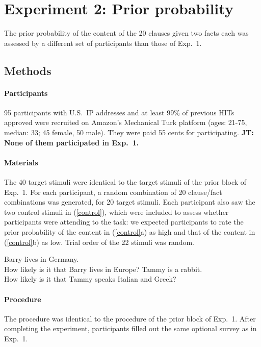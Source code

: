 \documentclass[11pt,fleqn]{article}
\newcommand{\6}{\mbox{$[\hspace*{-.6mm}[$}}
\newcommand{\9}{\mbox{$]\hspace*{-.6mm}]$}}
\newcommand{\jt}[1]{\textbf{\color{blue}JT: #1}}
\begin{document}
\section{Experiment 2: Prior probability}

The prior probability of the content of the 20 clauses given two facts each was assessed by a different set of participants than those of Exp.~1.

\subsection{Methods}

\paragraph{Participants} 95 participants with U.S.\ IP addresses and at least 99\% of previous HITs approved were recruited on Amazon's Mechanical Turk platform (ages: 21-75, median: 33; 45 female, 50 male). They were paid 55 cents for participating. \jt{None of them participated in Exp.~1.}

\paragraph{Materials} The 40 target stimuli were identical to the target stimuli of the prior block of Exp.~1. For each participant, a random combination of 20 clause/fact combinations was generated, for 20 target stimuli. Each participant also saw the two control stimuli in (\ref{control}), which were included to assess whether participants were attending to the task: we expected participants to rate the prior probability of the content in (\ref{control}a) as high and that of the content in (\ref{control}b) as low. Trial order of the 22 stimuli was random.

\begin{exe}
\ex\label{control2}
\begin{xlist}
 Barry lives in Germany. \\ How likely is it that Barry lives in Europe?
 Tammy is a rabbit. \\ How likely is it that Tammy speaks Italian and Greek?
\end{xlist}
\end{exe}

\paragraph{Procedure} The procedure was identical to the procedure of the prior block of Exp.~1. After completing the experiment, participants filled out the same optional survey as in Exp.~1.
\end{document}
